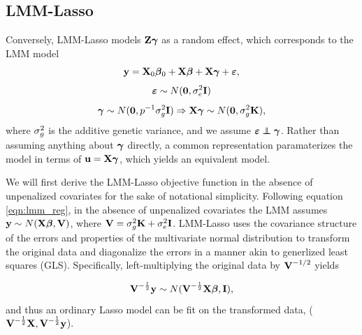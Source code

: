\subsection{LMM-Lasso}
\label{sec:lmmlasso}

Conversely, LMM-Lasso models $\textbf{Z}\boldsymbol{\gamma}$ as a random effect, which corresponds to the LMM model
\begin{equation}
    \label{eqn:lmm_reg}
    \textbf{y} = \textbf{X}_0\boldsymbol{\beta}{}_0 + \textbf{X}\boldsymbol{\beta}{} + \textbf{X}\boldsymbol{\gamma}+ \boldsymbol{\varepsilon}{},
\end{equation}
$$ \boldsymbol{\varepsilon}{} \sim N(\boldsymbol{0}, \sigma^2_e \textbf{I}) $$
$$ \boldsymbol{\gamma} \sim N(\boldsymbol{0}, p^{-1} \sigma^2_g \textbf{I}) \Rightarrow \textbf{X} \boldsymbol{\gamma} \sim N(\boldsymbol{0}, \sigma^2_g \textbf{K}), $$
where $\sigma^2_g$ is the additive genetic variance, and we assume $\beps \independent \bgamma$. Rather than assuming anything about $\boldsymbol{\gamma}$ directly, a common representation paramaterizes the model in terms of $\textbf{u}=\textbf{X}\boldsymbol{\gamma}$, which yields an equivalent model. 

We will first derive the LMM-Lasso objective function in the absence of unpenalized covariates for the sake of notational simplicity. Following equation \eqref{eqn:lmm_reg}, in the absence of unpenalized covariates the LMM assumes $\textbf{y} \sim N(\textbf{X} \boldsymbol{\beta}{}, \textbf{V})$, where $\textbf{V} = \sigma^2_g \textbf{K} + \sigma^2_e \textbf{I}$. LMM-Lasso uses the covariance structure of the errors and properties of the multivariate normal distribution to transform the original data and diagonalize the errors in a manner akin to generlized least squares (GLS). Specifically, left-multiplying the original data by $\textbf{V}^{-1/2}$ yields 

\begin{equation}
\label{eqn:rtY_distn}
\textbf{V}^{-\frac{1}{2}}\textbf{y} \sim N(\textbf{V}^{-\frac{1}{2}} \textbf{X} \boldsymbol{\beta}{}, \textbf{I}),
\end{equation}
and thus an ordinary Lasso model can be fit on the transformed data, ($\textbf{V}^{-\frac{1}{2}}\textbf{X}, \textbf{V}^{-\frac{1}{2}}\textbf{y}$). 

